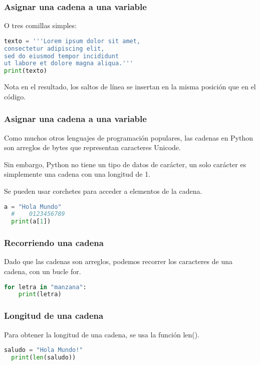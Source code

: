 \begin{frame}[fragile]
  \frametitle{Asignar una cadena a una variable}

  O tres comillas simples:

  \begin{lstlisting}[language=Python]
texto = '''Lorem ipsum dolor sit amet,
consectetur adipiscing elit,
sed do eiusmod tempor incididunt
ut labore et dolore magna aliqua.'''
print(texto)
  \end{lstlisting}

  \begin{alertblock}{Nota}
    en el resultado, los saltos de línea se insertan en la misma
    posición que en el código.
  \end{alertblock}
\end{frame}

\begin{frame}[fragile]
  \frametitle{Asignar una cadena a una variable}

  Como muchos otros lenguajes de programación populares, las cadenas
  en Python son arreglos de bytes que representan caracteres Unicode.

  \vspace{\baselineskip}
  Sin embargo, Python no tiene un tipo de datos de carácter, un solo
  carácter es simplemente una cadena con una longitud de 1.

  \vspace{\baselineskip}
  Se pueden usar corchetes para acceder a elementos de la cadena.

  \begin{lstlisting}[language=Python]
  a = "Hola Mundo"
  #    0123456789
  print(a[1])
  \end{lstlisting}
\end{frame}

\begin{frame}[fragile]
  \frametitle{Recorriendo una cadena}

  Dado que las cadenas son arreglos, podemos recorrer los caracteres
  de una cadena, con un bucle \textcolor{codeKeyword}{for}.

  \vspace{\baselineskip}
  \begin{lstlisting}[language=Python]
  for letra in "manzana":
    print(letra)
  \end{lstlisting}
\end{frame}

\begin{frame}[fragile]
  \frametitle{Longitud de una cadena}

  Para obtener la longitud de una cadena, se usa la función
  \textcolor{codeKeyword}{len}().

  \vspace{\baselineskip}
  \begin{lstlisting}[language=Python]
  saludo = "Hola Mundo!"
  print(len(saludo))
  \end{lstlisting}
\end{frame}

